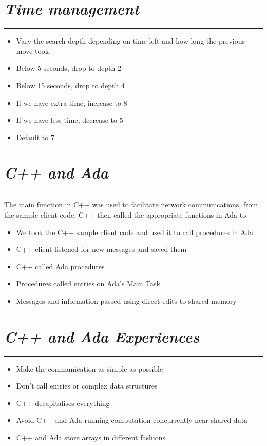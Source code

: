 \documentclass[10pt]{report}
\begin{document}
\begin{multicols}{2}
\section*{\emph{Time management}}
\hrule
    \begin{itemize}
  \item
    Vary the search depth depending on time left and how long the previous move took
  \item
     Below 5 seconds, drop to depth 2  
  \item
    Below 15 seconds, drop to depth 4
  \item
    If we have extra time, increase to 8
  \item
    If we have less time, decrease to 5
  \item
    Default to 7
  \end{itemize}

\section*{\emph{C++ and Ada}}
\hrule
The main function in C++ was used to facilitate network communications, from the sample client code. C++ then called the appropriate functions in Ada to 
    \begin{itemize}
  \item
    We took the C++ sample client code and used it to call procedures in Ada
  \item
    C++ client listened for new messages and saved them
  \item
   C++ called Ada procedures
  \item
   Procedures called entries on Ada's Main Task
  \item
   Messages and information passed using direct edits to shared memory
  \end{itemize}

\section*{\emph{\textmd{C++ and Ada Experiences}}}
\hrule
    \begin{itemize}
  \item
    Make the communication as simple as possible
  \item
   Don't call entries or complex data structures
  \item
   C++ decapitalises everything
  \item
   Avoid C++ and Ada running computation concurrently near shared data
  \item
   C++ and Ada store arrays in different fashions
  \end{itemize}


\end{multicols}
\end{document}
